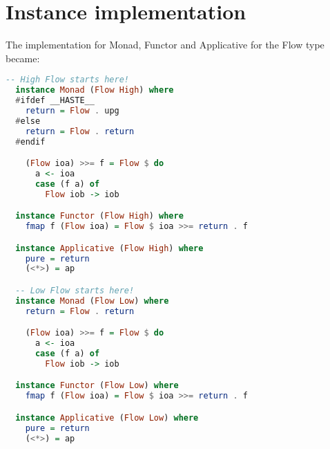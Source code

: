 \section{Instance implementation}
\label{app:instances}
The implementation for Monad, Functor and Applicative for the Flow type became:
\begin{lstlisting}[language=Haskell]
  -- High Flow starts here!
  instance Monad (Flow High) where
  #ifdef __HASTE__
    return = Flow . upg
  #else
    return = Flow . return
  #endif

    (Flow ioa) >>= f = Flow $ do
      a <- ioa
      case (f a) of
        Flow iob -> iob

  instance Functor (Flow High) where
    fmap f (Flow ioa) = Flow $ ioa >>= return . f

  instance Applicative (Flow High) where
    pure = return
    (<*>) = ap

  -- Low Flow starts here!
  instance Monad (Flow Low) where
    return = Flow . return

    (Flow ioa) >>= f = Flow $ do
      a <- ioa
      case (f a) of
        Flow iob -> iob

  instance Functor (Flow Low) where
    fmap f (Flow ioa) = Flow $ ioa >>= return . f

  instance Applicative (Flow Low) where
    pure = return
    (<*>) = ap
\end{lstlisting}
